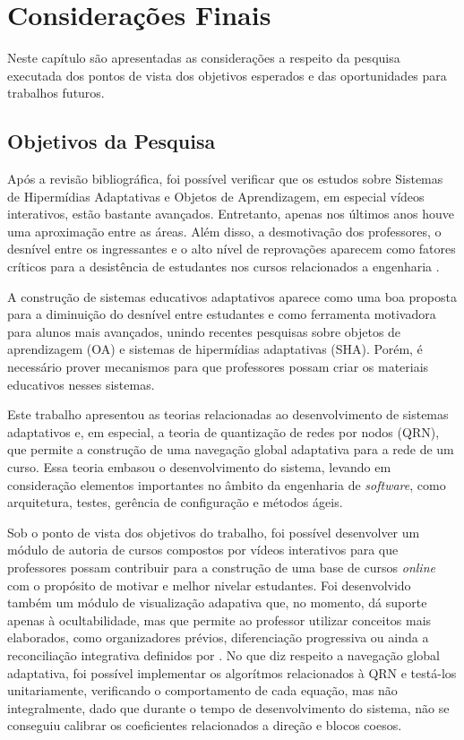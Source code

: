 \chapter*[Considerações Finais]{Considerações Finais}

Neste capítulo são apresentadas as considerações a respeito da pesquisa executada dos pontos de vista dos objetivos esperados e das oportunidades para trabalhos futuros.

\section*{Objetivos da Pesquisa}

Após a revisão bibliográfica, foi possível verificar que os estudos sobre Sistemas de Hipermídias Adaptativas e Objetos de Aprendizagem, em especial vídeos interativos, estão bastante avançados. Entretanto, apenas nos últimos anos houve uma aproximação entre as áreas. Além disso, a desmotivação dos professores, o desnível entre os ingressantes e o alto nível de reprovações aparecem como fatores críticos para a desistência de estudantes nos cursos relacionados a engenharia \cite{silva2005}. 

A construção de sistemas educativos adaptativos aparece como uma boa proposta para a diminuição do desnível entre estudantes e como ferramenta motivadora para alunos mais avançados, unindo recentes pesquisas sobre objetos de aprendizagem (OA) e sistemas de hipermídias adaptativas (SHA). Porém, é necessário prover mecanismos para que professores possam criar os materiais educativos nesses sistemas.

Este trabalho apresentou as teorias relacionadas ao desenvolvimento de sistemas adaptativos e, em especial, a teoria de quantização de redes por nodos (QRN), que permite a construção de uma navegação global adaptativa para a rede de um curso. Essa teoria embasou o desenvolvimento do sistema, levando em consideração elementos importantes no âmbito da engenharia de \textit{software}, como arquitetura, testes, gerência de configuração e métodos ágeis. 

Sob o ponto de vista dos objetivos do trabalho, foi possível desenvolver um módulo de autoria de cursos compostos por vídeos interativos para que professores possam contribuir para a construção de uma base de cursos \textit{online} com o propósito de motivar e melhor nivelar estudantes. Foi desenvolvido também um módulo de visualização adapativa que, no momento, dá suporte apenas à ocultabilidade, mas que permite ao professor utilizar conceitos mais elaborados, como organizadores prévios, diferenciação progressiva ou ainda a reconciliação integrativa definidos por . No que diz respeito a navegação global adaptativa, foi possível implementar os algorítmos relacionados à QRN e testá-los unitariamente, verificando o comportamento de cada equação, mas não integralmente, dado que durante o tempo de desenvolvimento do sistema, não se conseguiu calibrar os coeficientes relacionados a direção e blocos coesos. 


